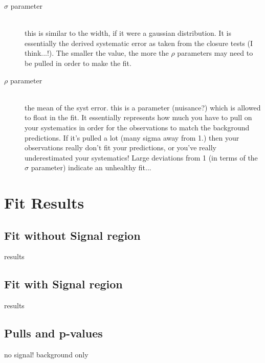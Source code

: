 \begin{description}
\item[$\sigma$ parameter]\hfill \\ this is similar to the width, if it were a gaussian 
distribution. It is essentially the derived systematic error as taken from the 
closure tests (I think...!). The smaller the value, the more the $\rho$ 
parameters may need to be pulled in order to make the fit.
\item[$\rho$ parameter] \hfill \\ the mean of the syst error. this is a parameter
(nuisance?) which is allowed to float in the fit. It essentially represents how 
much you have to pull on your systematics in order for the observations to match
the background predictions. If it's pulled a lot (many sigma away from 1.) then 
your observations really don't fit your predictions, or you've really 
underestimated your systematics! Large deviations from 1 (in terms of the
$\sigma$ parameter) indicate an unhealthy fit...
\end{description}



\section{Fit Results}  %
\label{sec:results_fit}

\subsection{Fit without Signal region}
results

\subsection{Fit with Signal region}
results

\subsection{Pulls and p-values}
no signal! background only
